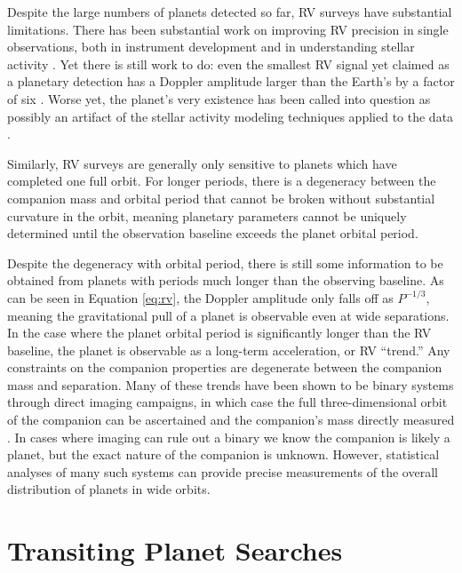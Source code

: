 Despite the large numbers of planets detected so far, RV surveys have substantial
limitations.
There has been substantial work on improving RV precision in single observations, both
in instrument development and in understanding stellar activity \citep{Fischer16}.
Yet there is still work to do: even the smallest RV signal yet claimed as a planetary
detection has a Doppler amplitude larger than the Earth's by a factor of six
\citep{Dumusque12}. 
Worse yet, the planet's very existence has been called into question as possibly 
an artifact of the stellar activity modeling techniques applied to the data
\citep{Rajpaul16}.

Similarly, RV surveys are generally only sensitive to planets which have completed
one full orbit.
For longer periods, there is a degeneracy between the companion mass and orbital period
that cannot be broken without substantial curvature in the orbit, meaning planetary
parameters cannot be uniquely determined until the observation baseline exceeds the
planet orbital period.

Despite the degeneracy with orbital period, there is still some information to be
obtained from planets with periods much longer than the observing baseline.
As can be seen in Equation \ref{eq:rv}, the Doppler amplitude only falls off as $P^{-1/3}$,
meaning the gravitational pull of a planet is observable even at wide separations.
In the case where the planet orbital period is significantly longer than the RV baseline,
the planet is observable as a long-term acceleration, or RV ``trend.''
Any constraints on the companion properties are degenerate between the companion mass
and separation.
Many of these trends have been shown to be binary systems through direct imaging campaigns, in which case the full three-dimensional orbit of the companion can be 
ascertained and the companion's mass directly measured \citep{Crepp12b, Crepp13a, Crepp13b}.
In cases where imaging can rule out a binary we know the companion is likely a planet,
but the exact nature of the companion is unknown. 
However, statistical analyses of many such systems can provide precise measurements of
the overall distribution of planets in wide orbits.


\section{Transiting Planet Searches}
